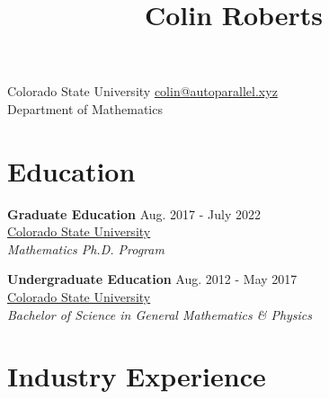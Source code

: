 \documentclass[12pt]{article} %
\begin{document}

\title{Colin Roberts} %


\begin{flushleft}
Colorado State University \hfill \href{mailto:colin@autoparallel.xyz}{colin@autoparallel.xyz}\\
Department of Mathematics \hfill %
\end{flushleft}
\noindent\makebox[\textwidth]{\rule{\textwidth}{0.5mm}}




\section{Education}

\begin{flushleft}
\textbf{Graduate Education} \hfill Aug. 2017 - July 2022\\
\href{http://www.colosate.edu}{Colorado State University} \hfill \\
\emph{Mathematics Ph.D. Program}\\
\vspace*{5pt}

\vspace*{10pt}
\textbf{Undergraduate Education} \hfill Aug. 2012 - May 2017\\
\href{http://www.colostate.edu}{Colorado State University}\\
\emph{Bachelor of Science in General Mathematics \& Physics}
\end{flushleft}
\noindent\makebox[\textwidth]{\rule{\textwidth}{0.5mm}}




\section{Industry Experience}
\end{document}
